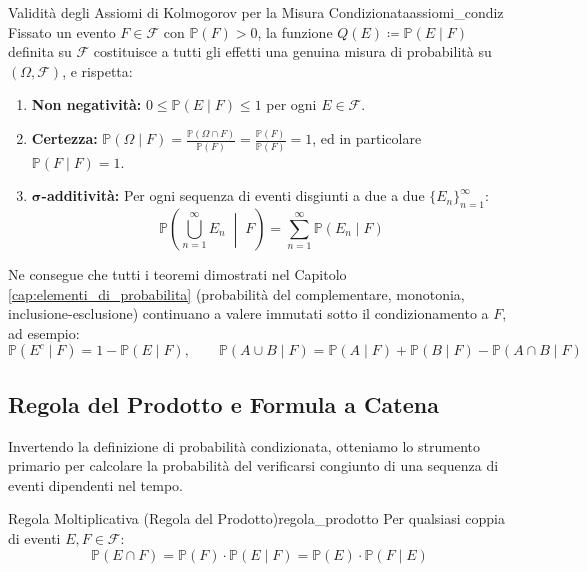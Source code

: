 \begin{proprieta}{Validità degli Assiomi di Kolmogorov per la Misura Condizionata}{assiomi_condiz}
Fissato un evento $F \in \mathcal{F}$ con $\mathbb{P}(F) > 0$, la funzione $Q(E) \coloneqq \mathbb{P}(E \mid F)$ definita su $\mathcal{F}$ costituisce a tutti gli effetti una genuina misura di probabilità su $(\Omega, \mathcal{F})$, e rispetta:
\begin{enumerate}
    \item \textbf{Non negatività:} $0 \le \mathbb{P}(E \mid F) \le 1$ per ogni $E \in \mathcal{F}$.
    \item \textbf{Certezza:} $\mathbb{P}(\Omega \mid F) = \frac{\mathbb{P}(\Omega \cap F)}{\mathbb{P}(F)} = \frac{\mathbb{P}(F)}{\mathbb{P}(F)} = 1$, ed in particolare $\mathbb{P}(F \mid F) = 1$.
    \item \textbf{$\bm{\sigma}$-additività:} Per ogni sequenza di eventi disgiunti a due a due $\{E_n\}_{n=1}^\infty$:
    \begin{equation}
        \mathbb{P}\left(\bigcup_{n=1}^\infty E_n \;\middle|\; F\right) = \sum_{n=1}^\infty \mathbb{P}(E_n \mid F)
    \end{equation}
\end{enumerate}
Ne consegue che tutti i teoremi dimostrati nel Capitolo \ref{cap:elementi_di_probabilita} (probabilità del complementare, monotonia, inclusione-esclusione) continuano a valere immutati sotto il condizionamento a $F$, ad esempio:
\begin{equation}
    \mathbb{P}(E^c \mid F) = 1 - \mathbb{P}(E \mid F), \qquad \mathbb{P}(A \cup B \mid F) = \mathbb{P}(A \mid F) + \mathbb{P}(B \mid F) - \mathbb{P}(A \cap B \mid F)
\end{equation}
\end{proprieta}

\subsection{Regola del Prodotto e Formula a Catena}

Invertendo la definizione di probabilità condizionata, otteniamo lo strumento primario per calcolare la probabilità del verificarsi congiunto di una sequenza di eventi dipendenti nel tempo.

\begin{proposizione}{Regola Moltiplicativa (Regola del Prodotto)}{regola_prodotto}
Per qualsiasi coppia di eventi $E, F \in \mathcal{F}$:
\begin{equation}
    \mathbb{P}(E \cap F) = \mathbb{P}(F) \cdot \mathbb{P}(E \mid F) = \mathbb{P}(E) \cdot \mathbb{P}(F \mid E)
\end{equation}
\end{proposizione}

